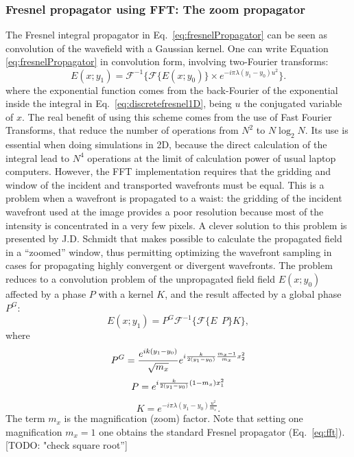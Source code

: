 \documentclass[]{spie}  %
\newcommand{\todo}[1]{{\color{red}[TODO: "#1'']}}
\begin{document}
\subsubsection{Fresnel propagator using FFT: The zoom propagator}
\label{sec:zoomPropagator}
The Fresnel integral propagator in Eq.~\ref{eq:fresnelPropagator} can be seen as convolution of the wavefield with a Gaussian kernel.    
One can write Equation \ref{eq:fresnelPropagator} in convolution form, involving two-Fourier transforms:
\begin{equation}\label{eq:fft}
E(x; y_1) = \mathcal{F}^{-1}\Big\{ \mathcal{F}\{E(x; y_0)\} \times e^{-i \pi \lambda (y_1-y_0) u^2} \Big\}.
\end{equation} 
where the exponential function comes from the back-Fourier of the exponential inside the integral in Eq.~\ref{eq:discretefresnel1D}, being $u$ the conjugated variable of $x$. 
The real benefit of using this scheme comes from the use of Fast Fourier Transforms, that reduce the number of operations from $N^2$ to $N \log_2 N$. Its use is essential when doing simulations in 2D, because the direct calculation of the integral lead to $N^4$ operations at the limit of calculation power of usual laptop computers. However, the FFT implementation requires that the gridding and window of the incident and transported wavefronts must be equal. This is a problem when a wavefront is propagated to a waist: the gridding of the incident wavefront used at the image provides a poor resolution because most of the intensity is concentrated in a very few pixels. A clever solution to this problem is presented by J.D. Schmidt \cite{schmidt} that makes possible to calculate the propagated field in a ``zoomed'' window, thus permitting optimizing the wavefront sampling in cases for propagating highly convergent or divergent wavefronts. The problem reduces to a convolution problem of the unpropagated field field $E(x;y_0)$ affected by a phase $P$ with a kernel $K$, and the result affected by a global phase $P^G$: 
\begin{equation}
E(x; y_1) = P^G \mathcal{F}^{-1} \Big\{ \mathcal{F} \big\{ E~~P \big\} K \Big\},
\end{equation}
where
\begin{equation}
P^G =  \frac { e^{ik(y_1-y_0) }}{\sqrt{m_x} }e^{i \frac{k}{2 (y_1-y_0)} \frac{m_x - 1}{m_x}x_2^2}  \\
\end{equation}
\begin{equation}
P = e^{i \frac{k}{2(y_1-y_0)} (1-m_x)x_1^2 } \\
\end{equation}
\begin{equation}
K = e^{-i \pi \lambda (y_1-y_0) \frac{u^2}{m_x} }.
\end{equation}
The term $m_x$ is the magnification (zoom) factor. 
Note that setting one magnification $m_x=1$ one obtains the standard Fresnel propagator (Eq.~\ref{eq:fft}). \todo{check square root}
\end{document}
